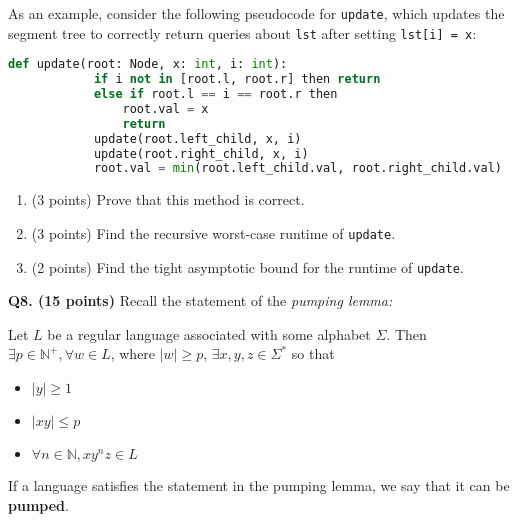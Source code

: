 \documentclass{article}
\begin{document}
    \medskip

    As an example, consider the following pseudocode for \texttt{update}, which updates the segment tree to correctly return queries about \texttt{lst} after setting \texttt{lst[i] = x}:

    \begin{lstlisting}[language=Python]
        def update(root: Node, x: int, i: int):
            if i not in [root.l, root.r] then return
            else if root.l == i == root.r then
                root.val = x
                return
            update(root.left_child, x, i)
            update(root.right_child, x, i)
            root.val = min(root.left_child.val, root.right_child.val)
    \end{lstlisting}
    \begin{enumerate}[label=\alph*)]
        \item (3 points) Prove that this method is correct.
        \pagebreak
        \item (3 points) Find the recursive worst-case runtime of \texttt{update}.
        \vfill
        \item (2 points) Find the tight asymptotic bound for the runtime of \texttt{update}.
        \vfill
    \end{enumerate}

    \pagebreak

    \textbf{Q8. (15 points)} Recall the statement of the \textit{pumping lemma:}

    \smallskip

    \noindent Let \(L\) be a regular language associated with some alphabet \(\Sigma\). Then \(\exists p \in \mathbb{N} ^+, \forall w \in L\), where \(|w| \geq p\), \(\exists x,y,z \in \Sigma ^*\) so that
    \begin{itemize}
        \item \(|y| \geq 1\)
        \item \(|xy| \leq p\)
        \item \(\forall n \in \mathbb{N}, xy^nz \in L\) 
    \end{itemize}
    If a language satisfies the statement in the pumping lemma, we say that it can be \textbf{pumped}.
\end{document}
